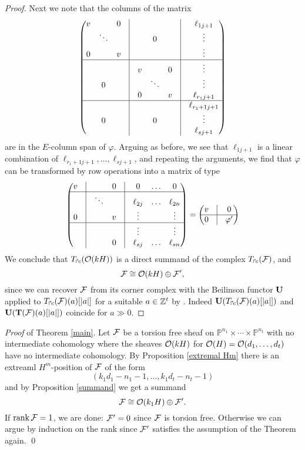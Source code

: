 \documentclass[twoside,12pt, leqno]{article}
\def\bT{{\bf T}}
\def\bU{{\bf U}}
\def\PP{{\mathbb P}}
\def\PPn{{\PP^{n_1} \times \cdots  \times \PP^{n_t}}}
\begin{document}
\begin{proof}
Next we note that the columns of the matrix
$$
\begin{pmatrix}
v &         & 0 &\vrule &  &     &    &  \vrule& \ell_{1j+1}   \cr 
   &\ddots &  &\vrule&    & 0& & \vrule&\vdots    \cr
0 & & v & \vrule&    & &  &\vrule& \vdots   \cr \hline
  & &  &  \vrule&  v  & & 0& \vrule&\vdots   \cr
 &0 & &   \vrule&    & \ddots& & \vrule& \vdots \cr
  & &  &  \vrule&  0  & & v & \vrule&\ell_{r_1j+1}    \cr \hline
      & &  &  \vrule&    & &  & \vrule&\ell_{r_1+1j+1}     \cr 
    & 0&  &  \vrule&    & 0&  & \vrule&\vdots    \cr 
      & &  &  \vrule&    & & & \vrule&\ell_{sj+1}    \cr 
\end{pmatrix}
$$
are in the $E$-column span of $\varphi$. Arguing as before, we see that $\ell_{1j+1}$ is a linear combination of $\ell_{r_1+1j+1},\ldots,\ell_{sj+1}$, and repeating the arguments, we find that $\varphi$ can be transformed by row operations into a matrix of type
$$\begin{pmatrix}
v&\vrule &         & 0 & \vrule &0 &\ldots & 0   \cr \hline
 &\vrule&   \ddots      &   & \vrule&\ell_{2j} &\ldots & \ell_{2n}   \cr
0 &\vrule& & v & \vrule &\vdots&  & \vdots  \cr \hline
 &\vrule & &  & \vrule&\vdots & & \vdots   \cr
  &\vrule& & 0 & \vrule&\ell_{sj} & \ldots & \ell_{sn}   \cr
\end{pmatrix} = 
\begin{pmatrix}
v &\vrule& 0 \cr \hline
0  &\vrule& \varphi'   \cr
\end{pmatrix}  
$$
We conclude that $T_{\Rsh \kern -1pt c}({\mathcal O}(kH))$ is a direct summand of the complex $T_{\Rsh \kern -1pt c}({\mathcal F})$, and
$$ {\mathcal F} \cong {\mathcal O}(kH)\oplus {\mathcal F}',$$
since we can recover ${\mathcal F}$ from its corner complex with the Beilinson functor $\bU$ applied to  $T_{\Rsh \kern -1pt c}({\mathcal F})(a)[|a|]$
for a suitable $a \in {\mathbb Z}^t$ by \cite[Theorem  0.1]{EES}. Indeed $\bU(T_{\Rsh \kern -1pt c}(\sF)(a)[|a|])$ and $\bU(\bT(\sF)(a)[|a|])$ coincide for
$ a\gg 0$.
\end{proof}

{\it Proof} of Theorem \ref{main}. Let ${\mathcal F}$ be a torsion free sheaf on $\PPn$ with no intermediate cohomology where the sheaves ${\mathcal O}(kH)$ for 
${\mathcal O}(H)={\mathcal O}(d_1,\ldots,d_t)$ have no intermediate cohomology. By Proposition \ref{extremal Hm} there is an extreaml $H^m$-position of ${\mathcal F}$ of the form
$$(k_1d_1-n_1-1,\ldots,k_1d_t-n_t-1)$$
and by Proposition \ref{summand} we get a summand
$${\mathcal F} \cong {\mathcal O}(k_1H) \oplus {\mathcal F}'.$$
If $\operatorname{rank} {\mathcal F}=1$, we are done: ${\mathcal F}'=0$ since ${\mathcal F}$ is torsion free. Otherwise we can argue by induction on the rank since ${\mathcal F}'$ satisfies
the assumption of the Theorem again. 
\qed
\end{document}
